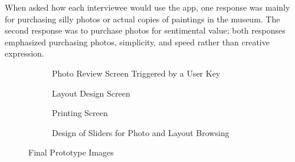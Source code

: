 \documentclass{tei2013}
\begin{document}
When asked how each interviewee would use the app, one response was mainly for purchasing silly photos or actual copies of paintings in the museum. The second response was to purchase photos for sentimental value; both responses emphasized purchasing photos, simplicity, and speed rather than creative expression.
\begin{figure}[Ht]
\centering
\begin{subfigure}[b]{.48\textwidth}
\centering
{}
\caption{Photo Review Screen Triggered by a User Key}
\label{fig:finalpic}
\end{subfigure}
\begin{subfigure}[b]{.48\textwidth}
\centering
{}
\caption{Layout Design Screen}
\label{fig:finallayout}
\end{subfigure}
\begin{subfigure}[b]{.48\textwidth}
\centering
{}
\caption{Printing Screen}
\label{fig:finalfinish}
\end{subfigure}
\begin{subfigure}[b]{.48\textwidth}
\centering
{}
\caption{Design of Sliders for Photo and Layout Browsing}
\label{fig:finalslider}
\end{subfigure}

\caption{Final Prototype Images}
\end{figure}
\end{document}

